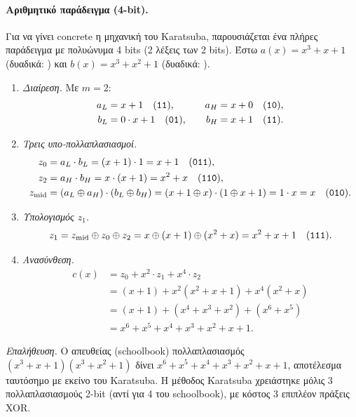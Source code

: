 \paragraph{Αριθμητικό παράδειγμα (4-bit).}
Για να γίνει concrete η μηχανική του Karatsuba, παρουσιάζεται ένα πλήρες
παράδειγμα με πολυώνυμα 4 bits (2 λέξεις των 2 bits).
Έστω $a(x) = x^3 + x + 1$ (δυαδικά: ) και
$b(x) = x^3 + x^2 + 1$ (δυαδικά: ).
\begin{enumerate}
  \item \textit{Διαίρεση.} Με $m = 2$:
  \begin{align*}
    a_L &= x + 1 \quad (\texttt{11}), &\quad a_H &= x + 0 \quad (\texttt{10}), \\
    b_L &= 0 \cdot x + 1 \quad (\texttt{01}), &\quad b_H &= x + 1 \quad (\texttt{11}).
  \end{align*}

  \item \textit{Τρεις υπο-πολλαπλασιασμοί.}
  \begin{align*}
    z_0 &= a_L \cdot b_L = (x+1) \cdot 1 = x + 1 \quad (\texttt{011}), \\
    z_2 &= a_H \cdot b_H = x \cdot (x+1) = x^2 + x \quad (\texttt{110}), \\
    z_{\text{mid}} &= (a_L \oplus a_H) \cdot (b_L \oplus b_H)
      = (x+1 \oplus x) \cdot (1 \oplus x+1) = 1 \cdot x = x \quad (\texttt{010}).
  \end{align*}

  \item \textit{Υπολογισμός $z_1$.}
  \begin{equation*}
    z_1 = z_{\text{mid}} \oplus z_0 \oplus z_2 = x \oplus (x+1) \oplus (x^2+x)
      = x^2 + x + 1 \quad (\texttt{111}).
  \end{equation*}

  \item \textit{Ανασύνθεση.}
  \begin{align*}
    c(x) &= z_0 + x^2 \cdot z_1 + x^4 \cdot z_2 \\
         &= (x+1) + x^2(x^2+x+1) + x^4(x^2+x) \\
         &= (x+1) + (x^4+x^3+x^2) + (x^6+x^5) \\
         &= x^6 + x^5 + x^4 + x^3 + x^2 + x + 1.
  \end{align*}
\end{enumerate}

\textit{Επαλήθευση.}
Ο απευθείας (schoolbook) πολλαπλασιασμός $(x^3+x+1)(x^3+x^2+1)$ δίνει
$x^6 + x^5 + x^4 + x^3 + x^2 + x + 1$, αποτέλεσμα ταυτόσημο με εκείνο του
Karatsuba. Η μέθοδος Karatsuba χρειάστηκε μόλις 3 πολλαπλασιασμούς 2-bit (αντί
για 4 του schoolbook), με κόστος 3 επιπλέον πράξεις XOR.


